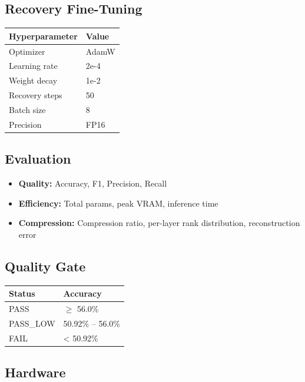 \subsection{Recovery Fine-Tuning}

\begin{table}[H]
\centering
\small
\begin{tabular}{ll}
\toprule
\textbf{Hyperparameter} & \textbf{Value} \\
\midrule
Optimizer & AdamW \\
Learning rate & 2e-4 \\
Weight decay & 1e-2 \\
Recovery steps & 50 \\
Batch size & 8 \\
Precision & FP16 \\
\bottomrule
\end{tabular}
\end{table}

\subsection{Evaluation}

\begin{itemize}
\item \textbf{Quality:} Accuracy, F1, Precision, Recall
\item \textbf{Efficiency:} Total params, peak VRAM, inference time
\item \textbf{Compression:} Compression ratio, per-layer rank distribution, reconstruction error

\end{itemize}
\subsection{Quality Gate}

\begin{table}[H]
\centering
\small
\begin{tabular}{ll}
\toprule
\textbf{Status} & \textbf{Accuracy} \\
\midrule
PASS & $\ge$ 56.0\% \\
PASS\_LOW & 50.92\% -- 56.0\% \\
FAIL & \textless{} 50.92\% \\
\bottomrule
\end{tabular}
\end{table}

\subsection{Hardware}


